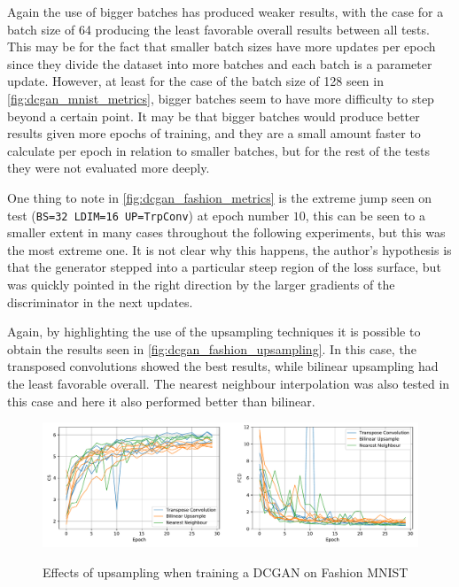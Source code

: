 Again the use of bigger batches has produced weaker results, with the case for a batch size of 64 producing the least favorable overall results between all tests. This may be for the fact that smaller batch sizes have more updates per epoch since they divide the dataset into more batches and each batch is a parameter update. However, at least for the case of the batch size of 128 seen in \autoref{fig:dcgan_mnist_metrics}, bigger batches seem to have more difficulty to step beyond a certain point. It may be that bigger batches would produce better results given more epochs of training, and they are a small amount faster to calculate per epoch in relation to smaller batches, but for the rest of the tests they were not evaluated more deeply.

One thing to note in \autoref{fig:dcgan_fashion_metrics} is the extreme jump seen on test (\texttt{BS=32 LDIM=16 UP=TrpConv}) at epoch number $10$, this can be seen to a smaller extent in many cases throughout the following experiments, but this was the most extreme one. It is not clear why this happens, the author's hypothesis is that the generator stepped into a particular steep region of the loss surface, but was quickly pointed in the right direction by the larger gradients of the discriminator in the next updates.

Again, by highlighting the use of the upsampling techniques it is possible to obtain the results seen in \autoref{fig:dcgan_fashion_upsampling}. In this case, the transposed convolutions showed the best results, while bilinear upsampling had the least favorable overall. The nearest neighbour interpolation was also tested in this case and here it also performed better than bilinear.
\begin{figure}[hbt]
    \centering
    \caption{Effects of upsampling when training a DCGAN on Fashion MNIST}
    \includegraphics[width=\textwidth]{chapters/Experiments/DCGAN/fashion_upsampling.pdf}
    \label{fig:dcgan_fashion_upsampling}
\end{figure}

